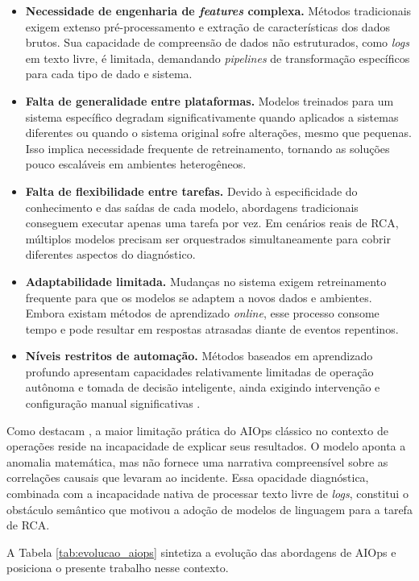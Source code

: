 \begin{itemize}
    \item \textbf{Necessidade de engenharia de \textit{features} complexa.} Métodos tradicionais exigem extenso pré-processamento e extração de características dos dados brutos. Sua capacidade de compreensão de dados não estruturados, como \textit{logs} em texto livre, é limitada, demandando \textit{pipelines} de transformação específicos para cada tipo de dado e sistema.
    \item \textbf{Falta de generalidade entre plataformas.} Modelos treinados para um sistema específico degradam significativamente quando aplicados a sistemas diferentes ou quando o sistema original sofre alterações, mesmo que pequenas. Isso implica necessidade frequente de retreinamento, tornando as soluções pouco escaláveis em ambientes heterogêneos.
    \item \textbf{Falta de flexibilidade entre tarefas.} Devido à especificidade do conhecimento e das saídas de cada modelo, abordagens tradicionais conseguem executar apenas uma tarefa por vez. Em cenários reais de RCA, múltiplos modelos precisam ser orquestrados simultaneamente para cobrir diferentes aspectos do diagnóstico.
    \item \textbf{Adaptabilidade limitada.} Mudanças no sistema exigem retreinamento frequente para que os modelos se adaptem a novos dados e ambientes. Embora existam métodos de aprendizado \textit{online}, esse processo consome tempo e pode resultar em respostas atrasadas diante de eventos repentinos.
    \item \textbf{Níveis restritos de automação.} Métodos baseados em aprendizado profundo apresentam capacidades relativamente limitadas de operação autônoma e tomada de decisão inteligente, ainda exigindo intervenção e configuração manual significativas \cite{survey_llm_aiops_2024}.
\end{itemize}

Como destacam , a maior limitação prática do AIOps clássico no contexto de operações reside na incapacidade de explicar seus resultados. O modelo aponta a anomalia matemática, mas não fornece uma narrativa compreensível sobre as correlações causais que levaram ao incidente. Essa opacidade diagnóstica, combinada com a incapacidade nativa de processar texto livre de \textit{logs}, constitui o obstáculo semântico que motivou a adoção de modelos de linguagem para a tarefa de RCA.

A Tabela \ref{tab:evolucao_aiops} sintetiza a evolução das abordagens de AIOps e posiciona o presente trabalho nesse contexto.

